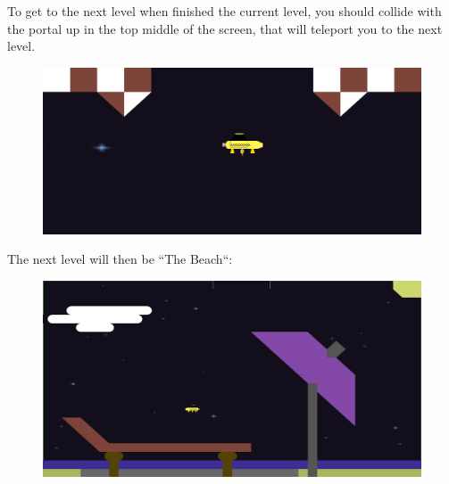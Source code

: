 \documentclass[../master.tex]{subfile}
\begin{document}
To get to the next level when finished the current level, you should collide with the portal up in the top middle of the screen, that will teleport you to the next level.
\begin{figure}[h]
	\includegraphics[width=1\textwidth]{./Pictures/SpaceTaxiPortal2.png}
\end{figure}

The next level will then be ``The Beach``:
\begin{figure}[h]
	\includegraphics[width=1\textwidth]{./Pictures/TheBeach.png}
\end{figure}
\end{document}
